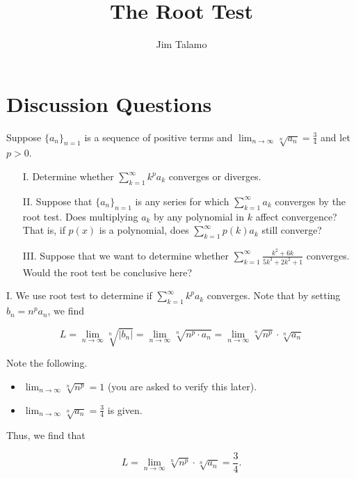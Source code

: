 \documentclass[noauthor,handout]{ximera}
\author{Jim Talamo}
\title[]{The Root Test}
\begin{document}
\begin{abstract}
\end{abstract}
\maketitle

\vspace{-0.5in}

\section{Discussion Questions}

\begin{problem}
Suppose $\{a_n\}_{n=1}$ is a sequence of positive terms and $\lim_{n \to \infty} \sqrt[n]{a_n} = \frac{3}{4}$ and let $p>0$.  
\begin{itemize}
\item[I.] Determine whether $\sum_{k=1}^{\infty} k^p a_k$ converges or diverges.  
\item[II.] Suppose that $\{a_n\}_{n=1}$ is any series for which $\sum_{k=1}^{\infty} a_k$ converges by the root test.  Does multiplying $a_k$ by any polynomial in $k$ affect convergence?  That is, if $p(x)$ is a polynomial, does $\sum_{k=1}^{\infty} p(k)a_k$ still converge?
\item[III.] Suppose that we want to determine whether $\sum_{k=1}^\infty \frac{k^2+6k}{5k^3 + 2k^2 + 1}$ converges.  Would the root test be conclusive here?
\end{itemize}

\begin{freeResponse}
I. We use root test to determine if $\sum_{k=1}^{\infty} k^p a_k$ converges.  Note that by setting $b_n = n^p a_n$, we find

\[
L = \lim_{n \to \infty}\sqrt[n]{ \left|b_n\right|} = \lim_{n \to \infty} \sqrt[n]{n^p \cdot a_n}= \lim_{n \to \infty} \sqrt[n]{n^p} \cdot \sqrt[n]{a_n}
\]

Note the following.

\begin{itemize}
\item $\lim_{n \to \infty} \sqrt[n]{n^p} = 1$ (you are asked to verify this later).
\item  $\lim_{n \to \infty} \sqrt[n]{a_n} = \frac{3}{4}$ is given.
\end{itemize}

Thus, we find that

\[
L= \lim_{n \to \infty} \sqrt[n]{n^p} \cdot \sqrt[n]{a_n} = \frac{3}{4}.
\]


\end{freeResponse}
\end{problem}
\end{document}
